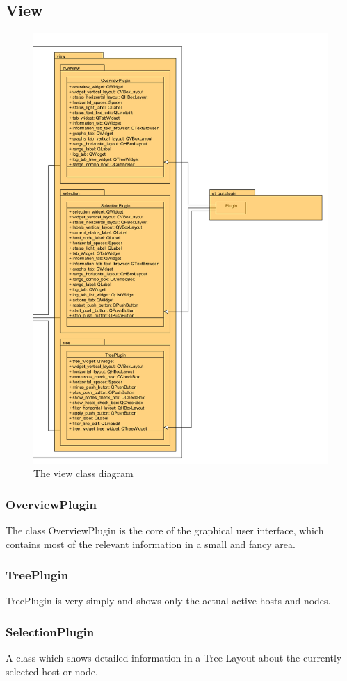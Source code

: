 \subsection{View}

\begin{figure}[!ht]
\begin{center}
\includegraphics[width=\linewidth]{./bilder/view.png}
\caption{The view class diagram}
\end{center}
\end{figure}
\subsubsection{OverviewPlugin}
The class OverviewPlugin is the core of the graphical user interface, which
contains most of the relevant information in a small and fancy area.
\subsubsection{TreePlugin}
TreePlugin is very simply and shows only the actual active hosts
and nodes.
\subsubsection{SelectionPlugin}
A class which shows detailed information in a Tree-Layout about the currently
selected host or node.
